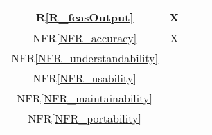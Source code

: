 \documentclass[12pt]{article}
\newcommand{\rref}[1]{R\ref{#1}}
\newcommand{\nfrref}[1]{NFR\ref{#1}}
\begin{document}
\begin{table}[h!]
{\begin{tabular}{|c|c|c|c|}
      \rref{R_feasOutput}            & X              \\ \hline %
      \nfrref{NFR_accuracy}          & X              \\ \hline %
      \nfrref{NFR_understandability} &                \\ \hline %
      \nfrref{NFR_usability}         &                \\ \hline %
      \nfrref{NFR_maintainability}   &                \\ \hline %
      \nfrref{NFR_portability}       &                \\ \hline %

\end{tabular}}
\end{table}
\end{document}
